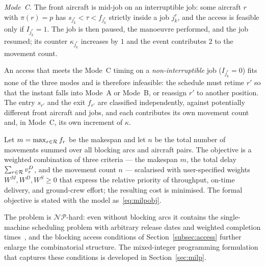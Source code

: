 \emph{Mode~C.}  The front aircraft is mid-job on an interruptible job:
some aircraft $r$ with $\pi(r) = p$ has $s_{j^r_k} < \tau < f_{j^r_k}$
strictly inside a job $j^r_k$, and the access is feasible only if
$I_{j^r_k} = 1$.  The job is then paused, the manoeuvre performed, and
the job resumed; its counter $\kappa_{j^r_k}$ increases by $1$ and the
event contributes $2$ to the movement count.

An access that meets the Mode~C timing on a \emph{non-interruptible} job
($I_{j^r_k} = 0$) fits none of the three modes and is therefore infeasible:
the schedule must retime $r'$ so that the instant falls into Mode~A or
Mode~B, or reassign $r'$ to another position.  The entry $s_{r'}$ and the
exit $f_{r'}$ are classified independently, against potentially different
front aircraft and jobs, and each contributes its own movement count and,
in Mode~C, its own increment of $\kappa$.


Let $m = \max_{r \in \mathcal{R}} f_r$ be the makespan and let $n$ be the total
number of movements summed over all blocking arcs and aircraft pairs.  The
objective is a weighted combination of three criteria --- the makespan $m$,
the total delay $\sum_{r \in \mathcal{R}} v^D_r$, and the movement count $n$ ---
scalarised with user-specified weights $W^M, W^D, W^S \ge 0$ that express
the relative priority of throughput, on-time delivery, and ground-crew
effort; the resulting cost is minimised.  The formal objective is stated
with the model as~\eqref{eq:milpobj}.

The problem is $\mathcal{NP}$-hard: even without blocking arcs it
contains the single-machine scheduling problem with arbitrary release
dates and weighted completion times~\citep{Lenstra1977}, and the
blocking access conditions of Section~\ref{subsec:access} further enlarge
the combinatorial structure.  The mixed-integer programming
formulation that captures these conditions is developed in
Section~\ref{sec:milp}.
